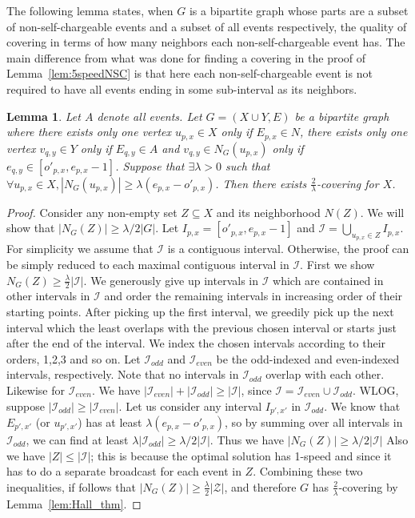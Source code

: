 \documentclass[11pt]{article}
\newtheorem{lemma}{Lemma}[section]
\begin{document}
\begin{titlepage}
The following lemma states, when $G$ is a bipartite graph whose parts are a subset of non-self-chargeable events and a
subset of all events respectively, the quality of covering in terms of how many neighbors each non-self-chargeable
event has. The main difference from what was done for finding a covering in the proof of Lemma~\ref{lem:5speedNSC} is
that here each non-self-chargeable event is not required to have all events ending in some sub-interval as its
neighbors.

\begin{lemma}
    \label{lem:cover2}
    Let $A$ denote all events. Let $G = (X \cup Y, E)$ be a bipartite graph where there exists only one vertex $u_{p,x} \in X$ only if $E_{p,x} \in N$,
    there exists only one vertex $v_{q,y} \in Y$ only if $E_{q,y} \in A$ and $v_{q,y} \in N_G(u_{p,x})$ only if $e_{q,y} \in [o'_{p,x}, e_{p,x}-1]$.
     Suppose that $\exists \lambda>0$ such that $\forall u_{p,x} \in X,  |N_G(u_{p,x})| \geq \lambda(e_{p,x} - o'_{p,x})$. Then
     there exists $\frac{2}{\lambda}$-covering for $X$.
\end{lemma}
\begin{proof}
  Consider any non-empty set $Z \subseteq X$ and its neighborhood $N(Z)$.
  We will show that $|N_G(Z)| \geq \lambda/2 |G|$. Let $I_{p,x} = [o'_{p,x}, e_{p,x}-1]$ and $\mathcal{I} = \bigcup_{u_{p,x}
    \in Z } I_{p,x}$. For simplicity we assume that $\mathcal{I}$ is a
  contiguous interval. Otherwise, the proof can be simply reduced to
  each maximal contiguous interval in $\mathcal{I}$.  First we show
  $N_G(Z) \geq \frac{\lambda}{2} |\mathcal{I}|$. We generously give up
  intervals in $\mathcal{I}$ which are contained in other intervals in
  $\mathcal{I}$ and order the remaining intervals in increasing order
  of their starting points. After picking up the first interval, we
  greedily pick up the next interval which the least overlaps with
  the previous chosen interval or starts just after the end of the interval.
  We index the chosen intervals according
  to their orders, 1,2,3 and so on.  Let $\mathcal{I}_{odd}$ and
  $\mathcal{I}_{even}$ be the odd-indexed and even-indexed intervals,
  respectively. Note that no intervals in $\mathcal{I}_{odd}$ overlap with each other.
  Likewise for $\mathcal{I}_{even}$. We have $|\mathcal{I}_{even}| + |\mathcal{I}_{odd}|
  \geq |\mathcal{I}|$, since $\mathcal{I} = \mathcal{I}_{even} \cup
  \mathcal{I}_{odd}$. WLOG, suppose
  $|\mathcal{I}_{odd}| \geq |\mathcal{I}_{even}|$.
  Let us consider any interval $I_{p',x'}$ in $\mathcal{I}_{odd}$.
  We know that $E_{p',x'}$ (or $u_{p',x'}$) has at least $\lambda(e_{p,x} - o'_{p,x})$,
  so by summing over all intervals in $\mathcal{I}_{odd}$, we can find at least
  $\lambda |\mathcal{I}_{odd}| \geq \lambda/2 |\mathcal{I}|$. Thus we have $|N_G(Z)| \geq \lambda/2 |\mathcal{I}|$
Also we have $|Z| \leq |\mathcal{I}|$; this is because the optimal solution has 1-speed and since it has to do a
separate broadcast for each event in $Z$. Combining these two inequalities, if follows that $|N_G(Z)| \geq
\frac{\lambda}{2}|\mathcal{Z}|$, and therefore $G$ has $\frac{2}{\lambda}$-covering by Lemma~\ref{lem:Hall_thm}.
\end{proof}



\end{titlepage}
\end{document}
